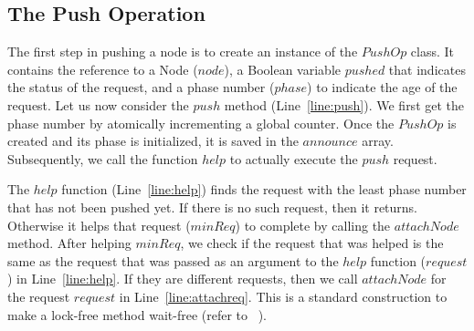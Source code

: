\documentclass{llncs}
\begin{document}
\vspace{-4mm}

\subsection{The Push Operation}
The first step in pushing a node is to create an instance of the $PushOp$ class. It contains the 
reference to a Node ($node$), a Boolean variable $pushed$ that indicates the status of the 
request, and a phase number ($phase$) to indicate the age of the request.
Let us now consider the $push$ method (Line~\ref{line:push}).
 We first get the phase number by atomically incrementing a global counter. 
Once the $PushOp$ is created and its phase is initialized, it is saved in the $announce$ array. 
Subsequently, we call the function $help$ to actually execute the $push$ request. 

The $help$ function (Line~\ref{line:help}) finds the request with the least phase number that has 
not been pushed yet. If there is no such request, then it returns. Otherwise it helps that request 
($minReq$) to complete by calling the $attachNode$ method. After helping $minReq$, we check if the request that was helped is the same as the request that was 
passed as an argument to the $help$ function ($request$) in Line~\ref{line:help}. If they are 
different requests, then we call $attachNode$ for the request $request$ in Line~\ref{line:attachreq}. 
This is a standard construction to make a lock-free method wait-free (refer to ~\cite{artOfMulti}).
\end{document}

